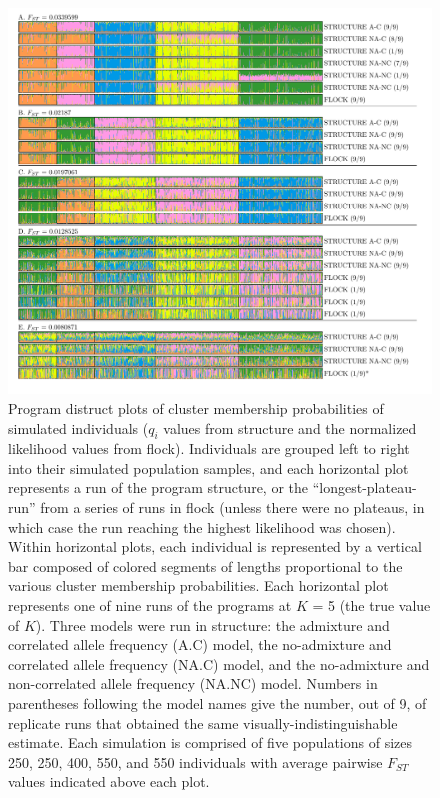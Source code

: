  \begin{figure}
\centering
  \includegraphics[width=.8\linewidth]{images/Figures-Pat/FlockturevStructureDistruct.pdf}%
  \caption{
  Program {\sc distruct} plots of cluster membership probabilities of simulated individuals
  ($q_i$ values from {\sc structure} and the normalized likelihood values from {\sc flock}). 
  Individuals are grouped left to right into their simulated population samples, and each 
  horizontal plot represents a run of the program
  {\sc structure}, or the ``longest-plateau-run'' from a series of runs in {\sc flock} (unless
  there were no plateaus, in which case the run reaching the highest likelihood was chosen).
  Within horizontal plots, each individual is represented by a vertical bar composed of colored
  segments of lengths proportional to the various cluster membership probabilities.
  Each horizontal plot
  represents one of nine 
 runs of the programs  at $K$ = 5 (the true value of $K$). Three models were run in structure: the admixture and correlated allele 
  frequency (A.C) model, 
the no-admixture and correlated allele frequency (NA.C) model, 
and the no-admixture and non-correlated allele frequency (NA.NC) model. Numbers in 
parentheses following the model names give the number, out of 9, of replicate runs
that obtained the same visually-indistinguishable estimate. Each simulation is comprised of
 five populations of sizes 250, 250, 400, 550, and 550 individuals with average pairwise $F_{ST}$ values
 indicated above each plot.}
  \label{fig:FvSdistruct}
\end{figure}

